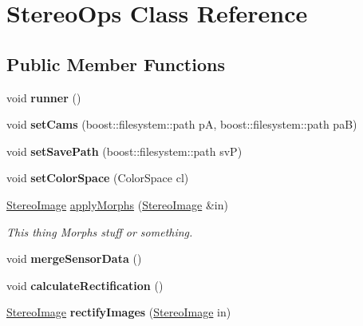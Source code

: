 \hypertarget{classStereoOps}{}\section{Stereo\+Ops Class Reference}
\label{classStereoOps}
\subsection*{Public Member Functions}
\begin{DoxyCompactItemize}
\item 
void {\bfseries runner} ()\hypertarget{classStereoOps_a574f61556ba6d18c19d00bbcfbd604c7}{}\label{classStereoOps_a574f61556ba6d18c19d00bbcfbd604c7}

\item 
void {\bfseries set\+Cams} (boost\+::filesystem\+::path pA, boost\+::filesystem\+::path paB)\hypertarget{classStereoOps_ad6dcdd9e0caeb06138bee7e098a555e6}{}\label{classStereoOps_ad6dcdd9e0caeb06138bee7e098a555e6}

\item 
void {\bfseries set\+Save\+Path} (boost\+::filesystem\+::path svP)\hypertarget{classStereoOps_aa7f256f175735d2f110f8adfacd0d277}{}\label{classStereoOps_aa7f256f175735d2f110f8adfacd0d277}

\item 
void {\bfseries set\+Color\+Space} (Color\+Space cl)\hypertarget{classStereoOps_a8f31aecd88ff8610c421248d96fa4446}{}\label{classStereoOps_a8f31aecd88ff8610c421248d96fa4446}

\item 
\hyperlink{classStereoImage}{Stereo\+Image} \hyperlink{classStereoOps_acc7f5ed2af2085d8489f06305077cb0d}{apply\+Morphs} (\hyperlink{classStereoImage}{Stereo\+Image} \&in)
\begin{DoxyCompactList}\small\item\em This thing Morphs stuff or something. \end{DoxyCompactList}\item 
void {\bfseries merge\+Sensor\+Data} ()\hypertarget{classStereoOps_a6d018a9f87132b177308277501211d13}{}\label{classStereoOps_a6d018a9f87132b177308277501211d13}

\item 
void {\bfseries calculate\+Rectification} ()\hypertarget{classStereoOps_a1299c20c5fec873221d47aefdc4bf2dc}{}\label{classStereoOps_a1299c20c5fec873221d47aefdc4bf2dc}

\item 
\hyperlink{classStereoImage}{Stereo\+Image} {\bfseries rectify\+Images} (\hyperlink{classStereoImage}{Stereo\+Image} in)\hypertarget{classStereoOps_a3ecd5671d9a890b7172ec694343610f3}{}\label{classStereoOps_a3ecd5671d9a890b7172ec694343610f3}


\end{DoxyCompactItemize}

